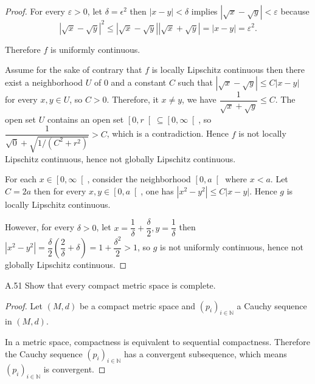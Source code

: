 \begin{proof}
    For every \( \varepsilon > 0 \), let \( \delta = \epsilon^{2} \) then \( \left\vert x - y \right\vert < \delta \) implies \( \left\vert \sqrt{x} - \sqrt{y} \right\vert < \varepsilon \) because
    \[
        {\left\vert \sqrt{x} - \sqrt{y} \right\vert}^{2} \le \left\vert \sqrt{x} - \sqrt{y} \right\vert \left\vert \sqrt{x} + \sqrt{y} \right\vert = \left\vert x - y \right\vert = \varepsilon^{2}.
    \]

    Therefore \( f \) is uniformly continuous.

    Assume for the sake of contrary that \( f \) is locally Lipschitz continuous then there exist a neighborhood \( U \) of \( 0 \) and a constant \( C \) such that \( \left\vert \sqrt{x} - \sqrt{y} \right\vert \le C \left\vert x - y \right\vert \) for every \( x, y \in U \), so \( C > 0 \). Therefore, it \( x \ne y \), we have \( \dfrac{1}{\sqrt{x} + \sqrt{y}} \le C \). The open set \( U \) contains an open set \( \left\lbrack 0, r \right\lbrack \subseteq \left\lbrack 0, \infty \right\lbrack \), so \( \dfrac{1}{\sqrt{0} + \sqrt{1/(C^{2} + r^{2})}} > C \), which is a contradiction. Hence \( f \) is not locally Lipschitz continuous, hence not globally Lipschitz continuous.

    For each \( x \in \left\lbrack 0, \infty \right\lbrack \), consider the neighborhood \( \left\lbrack 0, a \right\lbrack \) where \( x < a \). Let \( C = 2a \) then for every \( x, y \in \left\lbrack 0, a \right\lbrack \), one has \( \left\vert x^{2} - y^{2} \right\vert \le C \left\vert x - y \right\vert \). Hence \( g \) is locally Lipschitz continuous.

    However, for every \( \delta > 0 \), let \( x = \dfrac{1}{\delta} + \dfrac{\delta}{2}, y = \dfrac{1}{\delta} \) then \( \left\vert x^{2} - y^{2} \right\vert = \dfrac{\delta}{2}\left( \dfrac{2}{\delta} + \delta \right) = 1 + \dfrac{\delta^{2}}{2} > 1 \), so \( g \) is not uniformly continuous, hence not globally Lipschitz continuous.
\end{proof}

\begin{exercise}{A.51}
    Show that every compact metric space is complete.
\end{exercise}

\begin{proof}
    Let \( (M, d) \) be a compact metric space and \( {(p_{i})}_{i \in \mathbb{N}} \) a Cauchy sequence in \( (M, d) \).

    In a metric space, compactness is equivalent to sequential compactness. Therefore the Cauchy sequence \( {(p_{i})}_{i \in \mathbb{N}} \) has a convergent subsequence, which means \( {(p_{i})}_{i \in \mathbb{N}} \) is convergent.
\end{proof}

